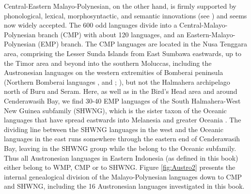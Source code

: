 Central-Eastern Malayo-Polynesian, on the other hand, is firmly supported by phonological, lexical, morphosyntactic, and semantic innovations (see \citealt{blust1993central}) and seems now widely accepted. The 600 odd languages divide into a Central-Malayo-Poly\-ne\-sian branch (CMP) with about 120 languages, and an Eastern-Malayo-Polynesian (EMP) branch. The CMP languages are located in the Nusa Tenggara area, comprising the Lesser Sunda Islands from East Sumbawa eastwards, up to the Timor area and beyond into the southern Moluccas, including the Austronesian languages on the western extremities of Bomberai peninsula (Northern Bomberai languages ,  and ; \citealt[24]{adelaar2005austronesian}), but not the Halmahera archipelago north of Buru and Seram. Here, as well as in the Bird's Head area and around Cenderawasih Bay, we find 30-40 EMP languages of the South Halmahera-West New Guinea subfamily (SHWNG), which is the sister taxon of the Oceanic languages that have spread eastwards into Melanesia and greater Oceania \citep{blust2009austronesian}. The dividing line between the SHWNG languages in the west and the Oceanic languages in the east runs somewhere through the eastern end of Cenderawasih Bay, leaving  in the SHWNG group while the  belong to the Oceanic subfamily. Thus all Austronesian languages in Eastern Indonesia (as defined in this book) either belong to WMP, CMP or to SHWNG. Figure \ref{fig:Austro2} presents the internal genealogical division of the Malayo-Polynesian languages down to CMP and SHWNG, including the 16 Austronesian languages investigated in this book.

